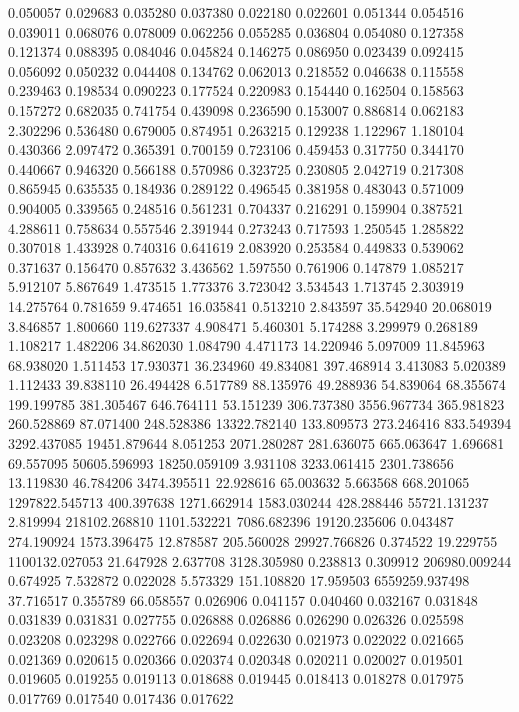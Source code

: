 0.050057
0.029683
0.035280
0.037380
0.022180
0.022601
0.051344
0.054516
0.039011
0.068076
0.078009
0.062256
0.055285
0.036804
0.054080
0.127358
0.121374
0.088395
0.084046
0.045824
0.146275
0.086950
0.023439
0.092415
0.056092
0.050232
0.044408
0.134762
0.062013
0.218552
0.046638
0.115558
0.239463
0.198534
0.090223
0.177524
0.220983
0.154440
0.162504
0.158563
0.157272
0.682035
0.741754
0.439098
0.236590
0.153007
0.886814
0.062183
2.302296
0.536480
0.679005
0.874951
0.263215
0.129238
1.122967
1.180104
0.430366
2.097472
0.365391
0.700159
0.723106
0.459453
0.317750
0.344170
0.440667
0.946320
0.566188
0.570986
0.323725
0.230805
2.042719
0.217308
0.865945
0.635535
0.184936
0.289122
0.496545
0.381958
0.483043
0.571009
0.904005
0.339565
0.248516
0.561231
0.704337
0.216291
0.159904
0.387521
4.288611
0.758634
0.557546
2.391944
0.273243
0.717593
1.250545
1.285822
0.307018
1.433928
0.740316
0.641619
2.083920
0.253584
0.449833
0.539062
0.371637
0.156470
0.857632
3.436562
1.597550
0.761906
0.147879
1.085217
5.912107
5.867649
1.473515
1.773376
3.723042
3.534543
1.713745
2.303919
14.275764
0.781659
9.474651
16.035841
0.513210
2.843597
35.542940
20.068019
3.846857
1.800660
119.627337
4.908471
5.460301
5.174288
3.299979
0.268189
1.108217
1.482206
34.862030
1.084790
4.471173
14.220946
5.097009
11.845963
68.938020
1.511453
17.930371
36.234960
49.834081
397.468914
3.413083
5.020389
1.112433
39.838110
26.494428
6.517789
88.135976
49.288936
54.839064
68.355674
199.199785
381.305467
646.764111
53.151239
306.737380
3556.967734
365.981823
260.528869
87.071400
248.528386
13322.782140
133.809573
273.246416
833.549394
3292.437085
19451.879644
8.051253
2071.280287
281.636075
665.063647
1.696681
69.557095
50605.596993
18250.059109
3.931108
3233.061415
2301.738656
13.119830
46.784206
3474.395511
22.928616
65.003632
5.663568
668.201065
1297822.545713
400.397638
1271.662914
1583.030244
428.288446
55721.131237
2.819994
218102.268810
1101.532221
7086.682396
19120.235606
0.043487
274.190924
1573.396475
12.878587
205.560028
29927.766826
0.374522
19.229755
1100132.027053
21.647928
2.637708
3128.305980
0.238813
0.309912
206980.009244
0.674925
7.532872
0.022028
5.573329
151.108820
17.959503
6559259.937498
37.716517
0.355789
66.058557
0.026906
0.041157
0.040460
0.032167
0.031848
0.031839
0.031831
0.027755
0.026888
0.026886
0.026290
0.026326
0.025598
0.023208
0.023298
0.022766
0.022694
0.022630
0.021973
0.022022
0.021665
0.021369
0.020615
0.020366
0.020374
0.020348
0.020211
0.020027
0.019501
0.019605
0.019255
0.019113
0.018688
0.019445
0.018413
0.018278
0.017975
0.017769
0.017540
0.017436
0.017622
